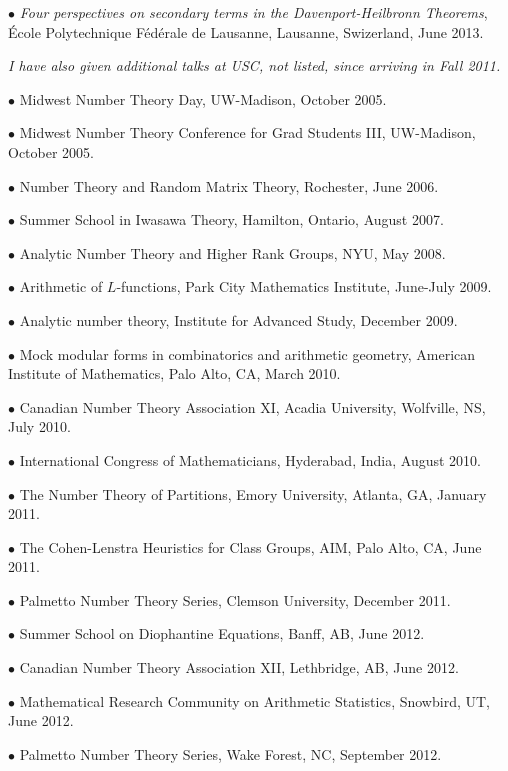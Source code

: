 \documentclass{article}
\newcommand{\categorywidth}{1in}        %
\newcommand{\infowidth}{5.8in}          %
\newcommand{\categorysep}{5pt}
\newcommand{\catlistlabel}[1]%
{\raisebox{0pt}[1ex][0pt]{\makebox[\labelwidth][l]%
    {\parbox[t]{\labelwidth}{\hspace{0pt}\textbf{#1}}}}}
\newenvironment{categories}{\begin{list}{}{
      \setlength{\labelwidth}{\categorywidth}
      \setlength{\leftmargin}{\labelwidth}
      \addtolength{\leftmargin}{\labelsep}
      \setlength{\topsep}{20pt}
      \setlength{\itemsep}{\categorysep}
      \renewcommand{\makelabel}{\catlistlabel}
      }}{\end{list}}
\newcommand{\category}[1]{\item[#1]}
\newcommand{\rawentry}[1]{{\begin{minipage}[t]{\infowidth}{#1}
    \end{minipage}}}
\begin{document}
\begin{flushleft}
\begin{categories}
$\bullet$ {\itshape Four perspectives on secondary terms in the Davenport-Heilbronn Theorems},
\'Ecole Polytechnique F\'ed\'erale de Lausanne, Lausanne, Swizerland, June 2013.

\rawentry{\itshape I have also given additional talks at USC, not listed, 
since arriving in Fall 2011.}

\category{Additional Conferences Attended}

$\bullet$ {Midwest Number Theory Day, UW-Madison, October 2005.}

$\bullet$ {Midwest Number Theory Conference for Grad Students III, UW-Madison, October 2005.}

$\bullet$ {Number Theory and Random Matrix Theory, Rochester, June 2006.}

$\bullet$ {Summer School in Iwasawa Theory, Hamilton, Ontario, August 2007.}

$\bullet$ {Analytic Number Theory and Higher Rank Groups, NYU, May 2008.}

$\bullet$ {Arithmetic of $L$-functions, Park City Mathematics Institute, June-July 2009.}

$\bullet$ {Analytic number theory, Institute for Advanced Study, December 2009.}

$\bullet$ {Mock modular forms in combinatorics and arithmetic geometry, American Institute of Mathematics,
Palo Alto, CA, March 2010.}

$\bullet$ Canadian Number Theory Association XI, Acadia University, Wolfville, NS, July 2010.

$\bullet$ International Congress of Mathematicians, Hyderabad, India, August 2010.

$\bullet$ The Number Theory of Partitions, Emory University, Atlanta, GA, January 2011.

$\bullet$ The Cohen-Lenstra Heuristics for Class Groups, AIM, Palo Alto, CA, June 2011.

$\bullet$ Palmetto Number Theory Series, Clemson University, December 2011.

$\bullet$ Summer School on Diophantine Equations, Banff, AB, June 2012.

$\bullet$ Canadian Number Theory Association XII, Lethbridge, AB, June 2012.

$\bullet$ Mathematical Research Community on Arithmetic Statistics, Snowbird, UT, June 2012.

$\bullet$ Palmetto Number Theory Series, Wake Forest, NC, September 2012.

  \category{Teaching \\ Experience}


\end{categories}
\end{flushleft}
\end{document}
